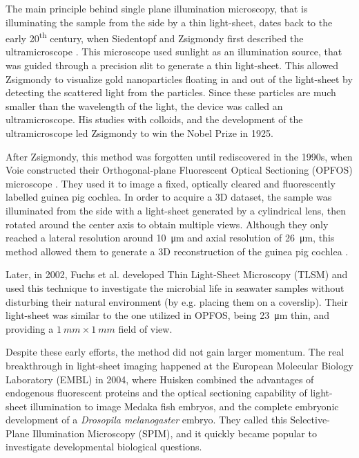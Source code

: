   

  The main principle behind single plane illumination microscopy, that is illuminating the sample from the side by a thin light-sheet, dates back to the early 20\textsuperscript{th} century, when Siedentopf and Zsigmondy first described the ultramicroscope \cite{siedentopf_uber_1902}. This microscope used sunlight as an illumination source, that was guided through a precision slit to generate a thin light-sheet. This allowed Zsigmondy to visualize gold nanoparticles floating in and out of the light-sheet by detecting the scattered light from the particles. Since these particles are much smaller than the wavelength of the light, the device was called an ultramicroscope. His studies with colloids, and the development of the ultramicroscope led Zsigmondy to win the Nobel Prize in 1925.

  After Zsigmondy, this method was forgotten until rediscovered in the 1990s, when Voie \etal constructed their Orthogonal-plane Fluorescent Optical Sectioning (OPFOS) microscope \cite{voie_orthogonal-plane_1993}. They used it to image a fixed, optically cleared and fluorescently labelled guinea pig cochlea. In order to acquire a 3D dataset, the sample was illuminated from the side with a light-sheet generated by a cylindrical lens, then rotated around the center axis to obtain multiple views. Although they only reached a lateral resolution around \SI{10}{\micro m} and axial resolution of \SI{26}{\micro m}, this method allowed them to generate a 3D reconstruction of the guinea pig cochlea \cite{voie_three-dimensional_1995}.

  Later, in 2002, Fuchs et al. developed Thin Light-Sheet Microscopy (TLSM) \cite{fuchs_thin_2002} and used this technique to investigate the microbial life in seawater samples without disturbing their natural environment (by e.g. placing them on a coverslip). Their light-sheet was similar to the one utilized in OPFOS, being \SI{23}{\micro m} thin, and providing a $\SI{1}{mm} \times \SI{1}{mm}$ field of view.

  Despite these early efforts, the method did not gain larger momentum. The real breakthrough in light-sheet imaging happened at the European Molecular Biology Laboratory (EMBL) in 2004, where Huisken \etal \cite{huisken_optical_2004} combined the advantages of endogenous fluorescent proteins and the optical sectioning capability of light-sheet illumination to image Medaka fish embryos, and the complete embryonic development of a \textit{Drosopila melanogaster} embryo. They called this Selective-Plane Illumination Microscopy (SPIM), and it quickly became popular to investigate developmental biological questions.

